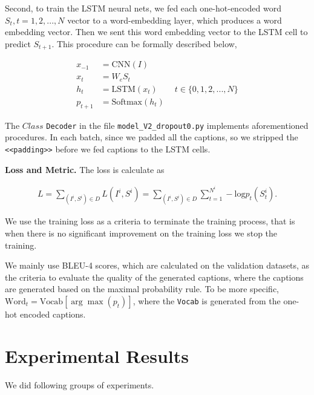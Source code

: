 \documentclass[fleqn,10pt]{SelfArx} %
\begin{document}
Second, to train the LSTM neural nets, we fed each one-hot-encoded word $S_t, t=1,2,...,N$ vector to a word-embedding layer, which produces a word embedding vector. Then we sent this word embedding vector to the LSTM cell to predict $S_{t+1}$. This procedure can be formally described below,

\begin{align}
 x_{-1} &= \text{CNN}(I) \nonumber \\
 x_{t} &= W_eS_{t} \nonumber\\
 h_{t} &= \text{LSTM}(x_t)\qquad t \in \{0,1,2,...,N\}\nonumber\\
p_{t+1} &= \text{Softmax}(h_t) 
\end{align}

The $Class$ \verb|Decoder|  in the file  \verb|model_V2_dropout0.py| implements aforementioned procedures. In each batch, since we padded all the captions, so we stripped the \verb|<<padding>>| before we fed captions to the LSTM cells.

\textbf{Loss and Metric.} The loss is calculate as

\begin{align}
L = \underset{(I^i,S^i)\in D}{\sum} L(I^i,S^i) = \underset{(I^i,S^i)\in D}{\sum} \sum_{t=1}^{N^i} -\text{log} p_t(S_t^i).
\end{align}

We use the training loss as a criteria to terminate the training process, that is when there is no significant improvement on the training loss we stop the training.

We mainly use BLEU-4 scores, which are calculated on the validation datasets, as the criteria to evaluate the quality of the generated captions, where the captions are generated based on the maximal probability rule.  To be more specific, $\text{Word}_t = \text{Vocab}[\arg\max (p_t)]$, where the \verb|Vocab| is generated from the one-hot encoded captions.

\section{Experimental Results}



We did following groups of experiments.
\end{document}

